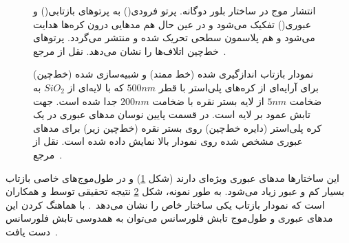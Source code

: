 \begin{figure}[tb]
	\caption{انتشار موج در ساختار بلور دوگانه. پرتو فرودی() به پرتوهای بازتابی() و عبوری() تفکیک می‌شود و در عین حال هم مدهایی درون کره‌ها هدایت می‌شود و هم پلاسمون سطحی تحریک شده و منتشر می‌‌گردد. پرتوهای خط‌چین اتلاف‌ها را نشان می‌دهد. نقل از مرجع~\cite{SHI20101059}.}\label{fig4_2}
\end{figure}
\begin{figure}[tb]
	\caption{نمودار بازتاب اندازگیری شده (خط ممتد) و شبیه‌سازی شده (خط‌چین) برای آرایه‌ای از کره‌های پلی‌استر با قطر $500nm$ که با لایه‌ای از $SiO_2$ به ضخامت $5nm$ از لایه بستر نقره با ضخامت $200nm$ جدا شده است. جهت تابش عمود بر لایه است. در قسمت پایین نوسان مدهای عبوری در یک کره پلی‌استر (دایره خط‌چین) روی بستر نقره (خط‌چین زیر) برای مدهای عبوری مشخص شده روی نمودار بالا نمایش داده شده است. نقل از مرجع~\cite{SHI20101059}.}\label{fig:5}
\end{figure}

این ساختارها مدهای عبوری ویژه‌ای دارند (شکل \ref{fig4_2}) و در طول‌موج‌های خاصی بازتاب بسیار کم و عبور زیاد می‌شود. به طور نمونه، شکل \ref{fig:5} نتیجه تحقیقی توسط  و همکاران است که نمودار بازتاب یکی ساختار خاص را نشان می‌دهد~\cite{SHI20101059}. با هماهنگ کردن این مدهای عبوری و طول‌موج تابش فلورسانس می‌توان به همدوسی تابش فلورسانس دست یافت~\cite{shi2014coherent}.

